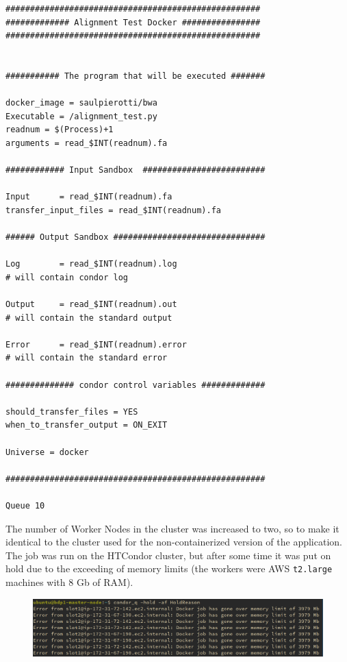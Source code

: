 \documentclass{article}
\begin{document}
\begin{lstlisting}
####################################################
############# Alignment Test Docker ################
####################################################


########### The program that will be executed #######

docker_image = saulpierotti/bwa
Executable = /alignment_test.py
readnum = $(Process)+1
arguments = read_$INT(readnum).fa

############ Input Sandbox  #########################

Input      = read_$INT(readnum).fa
transfer_input_files = read_$INT(readnum).fa

###### Output Sandbox ###############################

Log        = read_$INT(readnum).log
# will contain condor log

Output     = read_$INT(readnum).out
# will contain the standard output

Error      = read_$INT(readnum).error
# will contain the standard error

############## condor control variables #############

should_transfer_files = YES
when_to_transfer_output = ON_EXIT

Universe = docker

#####################################################

Queue 10
\end{lstlisting}

The number of Worker Nodes in the cluster was increased to two, so to make it identical to the cluster used for the non-containerized version of the application.
The job was run on the HTCondor cluster, but after some time it was put on hold due to the exceeding of memory limits (the workers were AWS \texttt{t2.large} machines with 8 Gb of RAM).

\begin{figure}[!h]
    \center
    \includegraphics[width=\textwidth]{./images/docker_hold.png}
\end{figure}
\FloatBarrier
\end{document}
